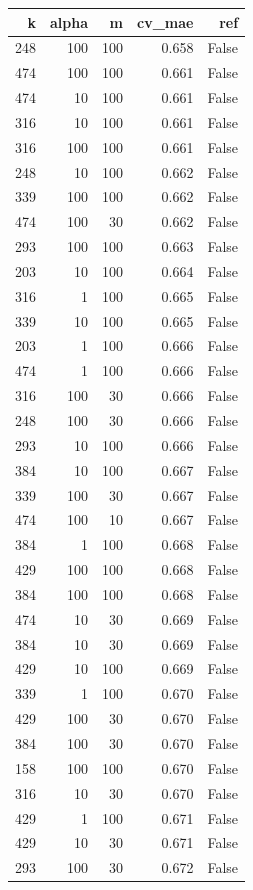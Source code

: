 \begin{tabular}{rrrrr}
\toprule
k & alpha & m & cv_mae & ref \\
\midrule
248 & 100 & 100 & 0.658 & False \\
474 & 100 & 100 & 0.661 & False \\
474 & 10 & 100 & 0.661 & False \\
316 & 10 & 100 & 0.661 & False \\
316 & 100 & 100 & 0.661 & False \\
248 & 10 & 100 & 0.662 & False \\
339 & 100 & 100 & 0.662 & False \\
474 & 100 & 30 & 0.662 & False \\
293 & 100 & 100 & 0.663 & False \\
203 & 10 & 100 & 0.664 & False \\
316 & 1 & 100 & 0.665 & False \\
339 & 10 & 100 & 0.665 & False \\
203 & 1 & 100 & 0.666 & False \\
474 & 1 & 100 & 0.666 & False \\
316 & 100 & 30 & 0.666 & False \\
248 & 100 & 30 & 0.666 & False \\
293 & 10 & 100 & 0.666 & False \\
384 & 10 & 100 & 0.667 & False \\
339 & 100 & 30 & 0.667 & False \\
474 & 100 & 10 & 0.667 & False \\
384 & 1 & 100 & 0.668 & False \\
429 & 100 & 100 & 0.668 & False \\
384 & 100 & 100 & 0.668 & False \\
474 & 10 & 30 & 0.669 & False \\
384 & 10 & 30 & 0.669 & False \\
429 & 10 & 100 & 0.669 & False \\
339 & 1 & 100 & 0.670 & False \\
429 & 100 & 30 & 0.670 & False \\
384 & 100 & 30 & 0.670 & False \\
158 & 100 & 100 & 0.670 & False \\
316 & 10 & 30 & 0.670 & False \\
429 & 1 & 100 & 0.671 & False \\
429 & 10 & 30 & 0.671 & False \\
293 & 100 & 30 & 0.672 & False \\

\end{tabular}
